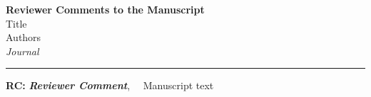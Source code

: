 \providecommand{\lettertitle}{Reviewer Comments to the Manuscript}
\providecommand{\papertitle}{Title}
\providecommand{\authors}{Authors}
\providecommand{\journal}{Journal}
\providecommand{\doi}{--}





{\Large\bf \lettertitle}\\[1em]
{\huge \papertitle}\\[1em]
{\authors}\\
{\it \journal }\\
\hrule

\hfill {\bfseries \color{gray}RC:} \textbf{\color{gray}\textit{Reviewer Comment}},\(\quad\) \vrule width 3pt \hspace{5pt} {\selectfont Manuscript text}

\renewcommand\thesubsection{Q\arabic{section}.\arabic{subsection}}